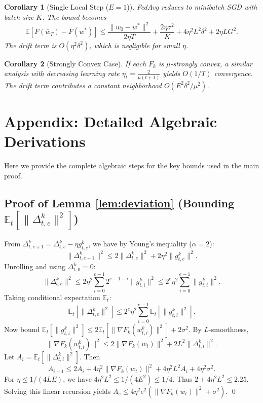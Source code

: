 \documentclass{article}
\newtheorem{corollary}{Corollary}
\begin{document}
\begin{corollary}[Single Local Step ($E=1$)]
FedAvg reduces to minibatch SGD with batch size $K$. The bound becomes
\begin{equation}
\mathbb{E}[F(\bar{w}_T) - F(w^*)] \le \frac{\|w_0 - w^*\|^2}{2\eta T} + \frac{2\eta \sigma^2}{K} + 4\eta^2 L^2 \delta^2 + 2\eta L G^2.
\end{equation}
The drift term is $O(\eta^2 \delta^2)$, which is negligible for small $\eta$.
\end{corollary}

\begin{corollary}[Strongly Convex Case]
If each $F_k$ is $\mu$-strongly convex, a similar analysis with decreasing learning rate $\eta_t = \frac{2}{\mu(t+1)}$ yields $O(1/T)$ convergence. The drift term contributes a constant neighborhood $O(E^2\delta^2/\mu^2)$.
\end{corollary}

\appendix
\section*{Appendix: Detailed Algebraic Derivations}
Here we provide the complete algebraic steps for the key bounds used in the main proof.

\subsection*{Proof of Lemma \ref{lem:deviation} (Bounding $\mathbb{E}_t[\|\Delta_{t,e}^k\|^2]$)}
From $\Delta_{t,e+1}^k = \Delta_{t,e}^k - \eta g_{t,e}^k$, we have by Young's inequality ($\alpha=2$):
\begin{equation}
\|\Delta_{t,e+1}^k\|^2 \le 2\|\Delta_{t,e}^k\|^2 + 2\eta^2 \|g_{t,e}^k\|^2.
\end{equation}
Unrolling and using $\Delta_{t,0}^k=0$:
\begin{equation}
\|\Delta_{t,e}^k\|^2 \le 2\eta^2 \sum_{i=0}^{e-1} 2^{e-1-i} \|g_{t,i}^k\|^2 \le 2^e \eta^2 \sum_{i=0}^{e-1} \|g_{t,i}^k\|^2.
\end{equation}
Taking conditional expectation $\mathbb{E}_t$:
\begin{equation}
\mathbb{E}_t[\|\Delta_{t,e}^k\|^2] \le 2^e \eta^2 \sum_{i=0}^{e-1} \mathbb{E}_t[\|g_{t,i}^k\|^2].
\end{equation}
Now bound $\mathbb{E}_t[\|g_{t,i}^k\|^2] \le 2\mathbb{E}_t[\|\nabla F_k(w_{t,i}^k)\|^2] + 2\sigma^2$. By $L$-smoothness,
\begin{equation}
\|\nabla F_k(w_{t,i}^k)\|^2 \le 2\|\nabla F_k(w_t)\|^2 + 2L^2 \|\Delta_{t,i}^k\|^2.
\end{equation}
Let $A_i = \mathbb{E}_t[\|\Delta_{t,i}^k\|^2]$. Then
\begin{equation}
A_{i+1} \le 2A_i + 4\eta^2 \|\nabla F_k(w_t)\|^2 + 4\eta^2 L^2 A_i + 4\eta^2 \sigma^2.
\end{equation}
For $\eta \le 1/(4LE)$, we have $4\eta^2 L^2 \le 1/(4E^2) \le 1/4$. Thus $2 + 4\eta^2 L^2 \le 2.25$. Solving this linear recursion yields $A_e \le 4\eta^2 e^2 (\|\nabla F_k(w_t)\|^2 + \sigma^2)$. \qed
\end{document}
